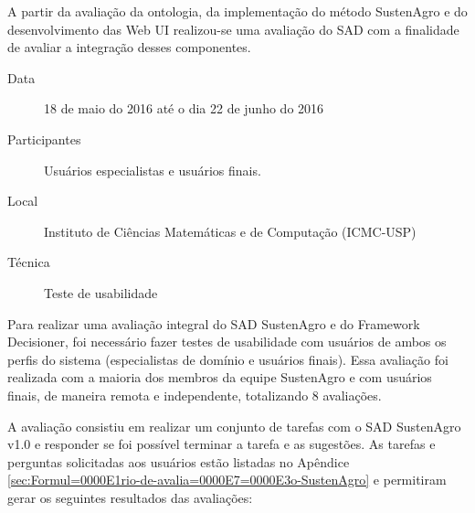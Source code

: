 A partir da avaliação da ontologia, da implementação do método SustenAgro
e do desenvolvimento das Web UI realizou-se uma avaliação do SAD com
a finalidade de avaliar a integração desses componentes.
\begin{description}
\item [{Data}] 18 de maio do 2016 até o dia 22 de junho do 2016
\item [{Participantes}] Usuários especialistas e usuários finais.
\item [{Local}] Instituto de Ciências Matemáticas e de Computação (ICMC-USP)
\item [{Técnica}] Teste de usabilidade
\end{description}
Para realizar uma avaliação integral do SAD SustenAgro e do Framework
Decisioner, foi necessário fazer testes de usabilidade com usuários
de ambos os perfis do sistema (especialistas de domínio e usuários
finais). Essa avaliação foi realizada com a maioria dos membros da
equipe SustenAgro e com usuários finais, de maneira remota e independente,
totalizando 8 avaliações.

A avaliação consistiu em realizar um conjunto de tarefas com o SAD
SustenAgro v1.0 e responder se foi possível terminar a tarefa e as
sugestões. As tarefas e perguntas solicitadas aos usuários estão listadas
no Apêndice \ref{sec:Formul=0000E1rio-de-avalia=0000E7=0000E3o-SustenAgro}
e permitiram gerar os seguintes resultados das avaliações:

